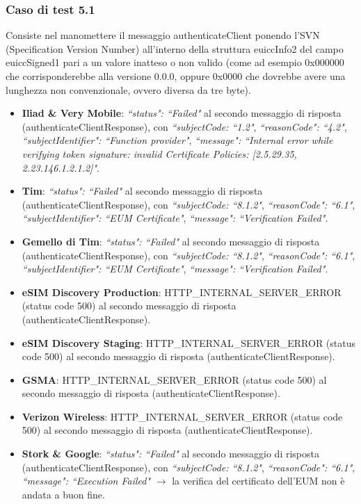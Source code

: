 \documentclass[10pt, oneside]{book}
\begin{document}
\subsubsection{Caso di test 5.1}
Consiste nel manomettere il messaggio authenticateClient ponendo l'SVN (Specification Version Number) all'interno della struttura euiccInfo2 del campo euiccSigned1 pari a un valore inatteso o non valido (come ad esempio 0x000000 che corrisponderebbe alla versione 0.0.0, oppure 0x0000 che dovrebbe avere una lunghezza non convenzionale, ovvero diversa da tre byte).
\begin{itemize}
\item \textbf{Iliad \& Very Mobile}: \textit{``status": ``Failed"} al secondo messaggio di risposta (authenticateClientResponse), con \textit{``subjectCode: ``1.2"}, \textit{``reasonCode": ``4.2"}, \textit{``subjectIdentifier": ``Function provider"}, \textit{``message": ``Internal error while verifying token signature: invalid Certificate Policies: [2.5.29.35, 2.23.146.1.2.1.2]"}.
\item \textbf{Tim}: \textit{``status": ``Failed"} al secondo messaggio di risposta (authenticateClientResponse), con \textit{``subjectCode: ``8.1.2"}, \textit{``reasonCode": ``6.1"}, \textit{``subjectIdentifier": ``EUM Certificate"}, \textit{``message": ``Verification Failed"}.
\item \textbf{Gemello di Tim}: \textit{``status": ``Failed"} al secondo messaggio di risposta (authenticateClientResponse), con \textit{``subjectCode: ``8.1.2"}, \textit{``reasonCode": ``6.1"}, \textit{``subjectIdentifier": ``EUM Certificate"}, \textit{``message": ``Verification Failed"}.
\item \textbf{eSIM Discovery Production}: HTTP\_INTERNAL\_SERVER\_ERROR (status code 500) al secondo messaggio di risposta (authenticateClientResponse).
\item \textbf{eSIM Discovery Staging}: HTTP\_INTERNAL\_SERVER\_ERROR (status code 500) al secondo messaggio di risposta (authenticateClientResponse).
\item \textbf{GSMA}: HTTP\_INTERNAL\_SERVER\_ERROR (status code 500) al secondo messaggio di risposta (authenticateClientResponse).
\item \textbf{Verizon Wireless}: HTTP\_INTERNAL\_SERVER\_ERROR (status code 500) al secondo messaggio di risposta (authenticateClientResponse).
\item \textbf{Stork \& Google}: \textit{``status": ``Failed"} al secondo messaggio di risposta (authenticateClientResponse), con \textit{``subjectCode: ``8.1.2"}, \textit{``reasonCode": ``6.1"}, \textit{``message": ``Execution Failed"} $\rightarrow$ la verifica del certificato dell'EUM non è andata a buon fine.

\end{itemize}
\end{document}
